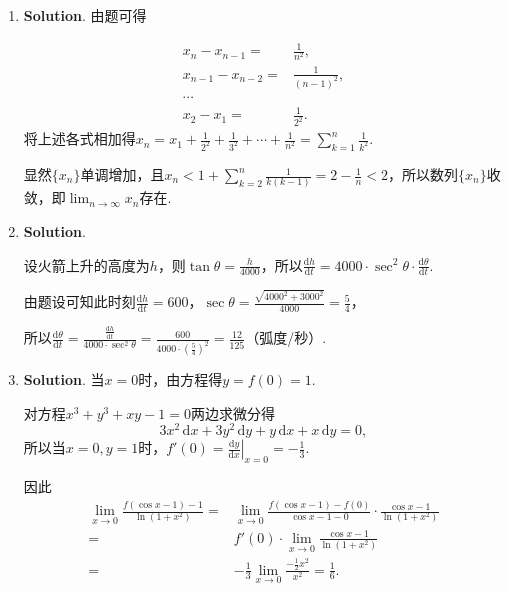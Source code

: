 \documentclass[../main.tex]{subfiles}
\begin{document}
\begin{enumerate}
    \item \textbf{Solution}. 由题可得

          \[
              \begin{aligned}
                  x_{n}-x_{n-1}= {}   & \frac{1}{n^2},     \\
                  x_{n-1}-x_{n-2}= {} & \frac{1}{(n-1)^2}, \\
                  \cdots              &                    \\
                  x_{2}- x_{1}= {}    & \frac{1}{2^2}.
              \end{aligned}
          \]
          将上述各式相加得$x_{n}=x_{1}+\frac{1}{2^{2}}+\frac{1}{3^{2}}+\cdots+\frac{1}{n^{2}}
              =\sum_{k=1}^{n}\frac{1}{k^{2}}$.

          显然$\{x_{n}\}$单调增加，且$x_{n}<1+\sum_{k=2}^{n}\frac{1}{k(k-1)}=2-\frac{1}{n}
              <2$，所以数列$\{ x_{n}\}$收敛，即$\lim_{n\to\infty}x_{n}$存在.

    \item \textbf{Solution}.

          设火箭上升的高度为$h$，则$\tan\theta=\frac{h}{4000}$，所以$\frac{\mathrm{d}h}{\mathrm{d}t}
              =4000\cdot\sec^{2}\theta\cdot\frac{\mathrm{d}\theta}{\mathrm{d}t}$.

          由题设可知此时刻$\frac{\mathrm{d}h}{\mathrm{d}t}=600$，$\sec\theta=\frac{\sqrt{4000^{2}+3000^{2}}}{4000}
              =\frac{5}{4}$，

          所以$\frac{\mathrm{d}\theta}{\mathrm{d}t}=\frac{\frac{\mathrm{d}h}{\mathrm{d}t}}{4000\cdot\sec^{2}\theta}
              =\frac{600}{4000\cdot\left(\frac{5}{4}\right)^{2}}=\frac{12}{125}$（弧度/秒）.

    \item \textbf{Solution}. 当$x=0$时，由方程得$y=f(0)=1$.

          对方程$x^{3}+y^{3}+xy-1=0$两边求微分得
          \[
              3x^{2}\,\mathrm{d}x+3y^{2}\,\mathrm{d}y+y\,\mathrm{d}x+x\,\mathrm{d}y=0,
          \]
          所以当$x=0,y=1$时，$f'(0)=\left.\frac{\mathrm{d}y}{\mathrm{d}x}
              \right|_{x=0}=-\frac{1}{3}$.

          因此
          \[
              \begin{aligned}
                  \lim_{x\to 0}\frac{f(\cos x-1)-1}{\ln(1+x^2)}= {} & \lim_{x\to0}\frac{f(\cos x-1)-f(0)}{\cos x -1 -0}\cdot\frac{\cos x -1}{\ln(1+x^2)} \\
                  = {}                                              & f'(0)\cdot\lim_{x\to0}\frac{\cos x -1}{\ln(1+x^2)}                                 \\
                  = {}                                              & -\frac{1}{3}\lim_{x\to0}\frac{-\frac{1}{2}x^2}{x^2} = \frac{1}{6}.
              \end{aligned}
          \]
\end{enumerate}
\end{document}
